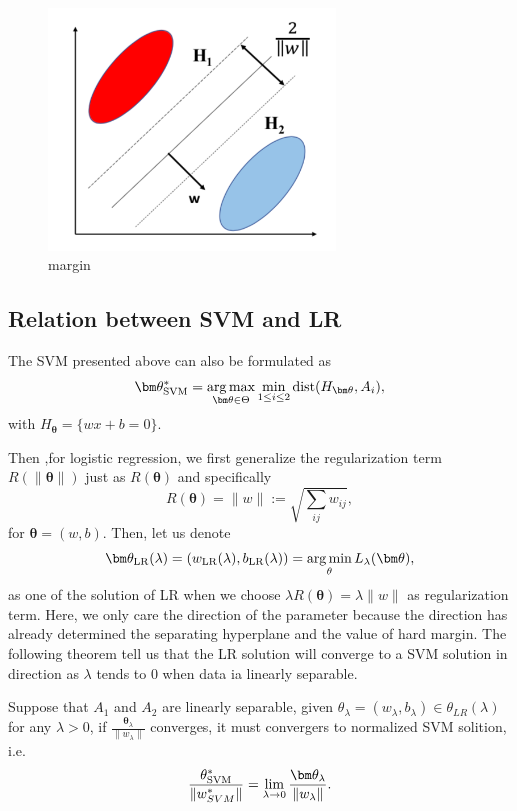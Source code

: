 \begin{figure}
	\centering
	\includegraphics[width=3.0in]{./figures/margin.png}   
	\caption{margin}
	\label{margin}
\end{figure}

\blankpage
\newbreak
\subsection{Relation between SVM and LR}
The SVM presented above can also be formulated as
\begin{equation}\label{key}
\bm \theta^*_{\rm SVM} = \mathop{\arg\max}_{\bm \theta \in \Theta} \min_{1\le i\le 2} {\rm dist}(H_{\bm \theta}, A_i),
\end{equation}
with $H_{\bm \theta} = \{ wx + b = 0 \}$.

Then ,for logistic regression, we first generalize the regularization term $R(\|\bm \theta\|)$ just as $R(\bm \theta)$ and specifically 
\begin{equation}\label{key}
R(\bm \theta) = \|w\| := \sqrt{\sum_{ij} w_{ij}},
\end{equation}
for $\bm \theta = (w,b)$.
Then, let us denote 
\begin{equation}\label{key}
\bm\theta_{\rm LR}(\lambda) = (w_{\rm LR}(\lambda),b_{\rm LR}(\lambda)) = \mathop{\arg\min}_{\theta} L_\lambda(\bm \theta),
\end{equation}
as one of the solution of LR when we choose $\lambda R(\bm \theta) = \lambda \|w\|$ as regularization term. 
Here, we only care the direction of the parameter because the direction has already determined the separating hyperplane and the value of hard margin.
The following theorem tell us that the LR solution will converge to a SVM solution in direction as $\lambda$ tends to 0 when data ia linearly separable.
\begin{theorem}
	Suppose that $A_1$ and $A_2$ are linearly separable, given $\theta_\lambda = (w_\lambda,b_\lambda)\in \theta_{LR}(\lambda)$  for any $\lambda>0$, if $\frac{\bm\theta_\lambda}{\|w_\lambda\|}$ converges, it must convergers to normalized SVM solition, i.e.
	\begin{equation}\label{key}
	\frac{\theta^*_{\rm SVM}}{\|w^*_{SVM}\|}  = \lim_{\lambda \to 0} \frac{\bm\theta_\lambda}{\|w_\lambda\|}.
	\end{equation}
\end{theorem}




